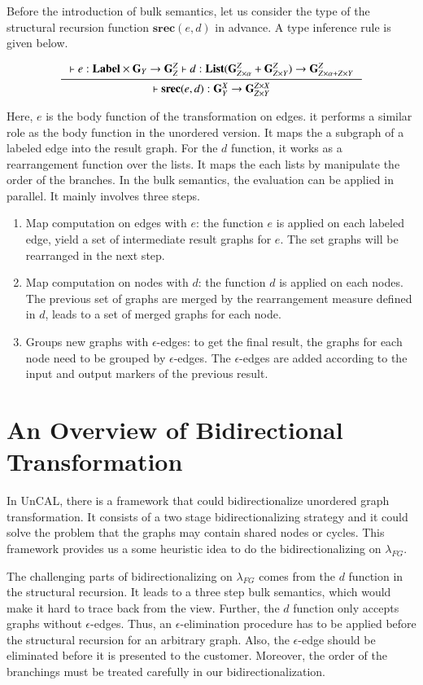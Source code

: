 \documentclass{llncs}
\begin{document}
Before the introduction of bulk semantics, let us consider the type of the structural recursion function $\mathbf{srec}(e,d)$ in advance. A type inference rule is given below.

$$\inference{\vdash e:\mathbf{Label}\times\mathbf{G}_Y\rightarrow\mathbf{G}^Z_Z \vdash d:\mathbf{List}(\mathbf{G}^Z_{Z\times\alpha}+\mathbf{G}^Z_{Z\times Y})\rightarrow\mathbf{G}^Z_{Z\times\alpha+Z\times Y}}{\vdash\mathbf{srec}(e,d):\mathbf{G}^X_Y\rightarrow\mathbf{G}^{Z\times X}_{Z\times Y}}$$

Here, $e$ is the body function of the transformation on edges. it performs a similar role as the body function in the unordered version. It maps the a subgraph of a labeled edge into the result graph. For the $d$ function, it works as a rearrangement function over the lists. It maps the each lists by manipulate the order of the branches. In the bulk semantics, the evaluation can be applied in parallel. It mainly involves three steps.
\begin{enumerate}
	\item Map computation on edges with $e$: the function $e$ is applied on each labeled edge, yield a set of intermediate result graphs for $e$. The set graphs will be rearranged in the next step.
	\item Map computation on nodes with $d$: the function $d$ is applied on each nodes. The previous set of graphs are merged by the rearrangement measure defined in $d$, leads to a set of merged graphs for each node.
	\item Groups new graphs with $\epsilon$-edges: to get the final result, the graphs for each node need to be grouped by $\epsilon$-edges. The $\epsilon$-edges are added according to the input and output markers of the previous result. 
\end{enumerate}

\section{An Overview of Bidirectional Transformation}\label{sec:overview}

In UnCAL, there is a framework that could bidirectionalize unordered graph transformation. It consists of a two stage bidirectionalizing strategy and it could solve the problem that the graphs may contain shared nodes or cycles. This framework provides us a some heuristic idea to do the bidirectionalizing on $\lambda_{FG}$. 

The challenging parts of bidirectionalizing on $\lambda_{FG}$ comes from the $d$ function in the structural recursion. It leads to a three step bulk semantics, which would make it hard to trace back from the view. Further, the $d$ function only accepts graphs without $\epsilon$-edges. Thus, an $\epsilon$-elimination procedure has to be applied before the structural recursion for an arbitrary graph. Also, the $\epsilon$-edge should be eliminated before it is presented to the customer. Moreover, the order of the branchings must be treated carefully in our bidirectionalization. 
\end{document}

